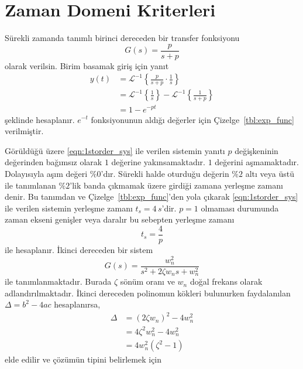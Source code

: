\chapter{Zaman Domeni Kriterleri}
Sürekli zamanda tanımlı birinci dereceden bir transfer fonksiyonu
\begin{equation}
    G(s)=\frac{p}{s+p}\label{eqn:1storder_sys}
\end{equation}
olarak verilsin. Birim basamak giriş için yanıt
\begin{equation}
\begin{split}
    y(t)&=\mathcal{L}^{-1}\left\{\frac{p}{s+p}\cdot\frac{1}{s}\right\}\\
    &=\mathcal{L}^{-1}\left\{\frac{1}{s}\right\}-\mathcal{L}^{-1}\left\{\frac{1}{s+p}\right\}\\
    &=1-e^{-pt}
\end{split}
\end{equation}
şeklinde hesaplanır. $e^{-t}$ fonksiyonunun aldığı değerler için Çizelge~\ref{tbl:exp_func} verilmiştir.

Görüldüğü üzere \ref{eqn:1storder_sys} ile verilen sistemin yanıtı $p$ değişkeninin değerinden bağımsız olarak $1$ değerine yakınsamaktadır. $1$ değerini aşmamaktadır. Dolayısıyla aşım değeri $\%0$'dır. Sürekli halde oturduğu değerin $\%2$ altı veya üstü ile tanımlanan $\%2$'lik banda çıkmamak üzere girdiği zamana yerleşme zamanı denir. Bu tanımdan ve Çizelge~\ref{tbl:exp_func}'den yola çıkarak \ref{eqn:1storder_sys} ile verilen sistemin yerleşme zamanı $t_s=4\,s$'dir. $p=1$ olmaması durumunda zaman ekseni genişler veya daralır bu sebepten yerleşme zamanı 
\begin{equation} 
    t_s=\frac{4}{p}
\end{equation} 
ile hesaplanır. İkinci dereceden bir sistem
\begin{equation}
    G(s)=\frac{w_n^2}{s^2+2\zeta w_ns+w_n^2}
\end{equation}
ile tanımlanmaktadır. Burada $\zeta$ sönüm oranı ve $w_n$ doğal frekans olarak adlandırılmaktadır. İkinci dereceden polinomun kökleri bulunurken faydalanılan $\Delta=b^2-4ac$ hesaplanırsa,
\begin{equation}
\begin{split}
    \Delta&=(2\zeta w_n)^2-4 w_n^2\\
    &=4\zeta^2 w_n^2-4 w_n^2\\
    &=4w_n^2(\zeta^2-1)
\end{split}
\end{equation}
elde edilir ve çözümün tipini belirlemek için

